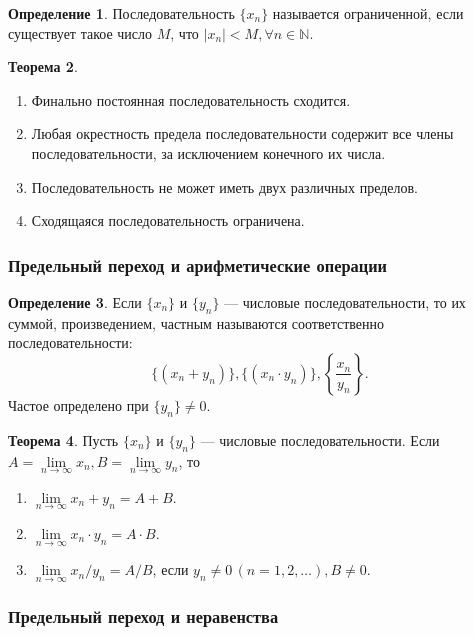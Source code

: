 \documentclass[12pt]{report}
\theoremstyle{definition}
\newtheorem{theorem}{Теорема}[chapter]
\newtheorem{definition}[theorem]{Определение}
\newcommand{\N}{\mathbb N}
\begin{document}
\begin{definition}
Последовательность $\{x_n\}$ называется ограниченной, если существует
такое число $M$, что $|x_n| < M, \forall n \in \N$.
\end{definition}

\begin{theorem}
  \begin{enumerate}
  \item Финально постоянная последовательность сходится.
    \item Любая окрестность предела последовательности содержит все члены последовательности,
    за исключением конечного их числа.
    \item Последовательность не может иметь двух различных пределов.
    \item Сходящаяся последовательность ограничена.
  \end{enumerate}
\end{theorem}

\subsubsection{Предельный переход и арифметические операции}

\begin{definition}
Если $\{x_n\}$ и $\{y_n\}$ --- числовые последовательности, то их суммой,
произведением, частным называются соответственно последовательности:
$$
\{(x_n + y_n)\}, \{(x_n \cdot y_n)\}, \left\{\dfrac{x_n}{y_n}\right\}.
$$
Частое определено при $\{y_n\} \ne 0$.
\end{definition}

\begin{theorem}
Пусть $\{x_n\}$ и $\{y_n\}$ --- числовые последовательности.
Если $A = \lim\limits_{n\rightarrow\infty} x_n, B = \lim\limits_{n\rightarrow\infty} y_n$, то
\begin{enumerate}
  \item $\lim\limits_{n\rightarrow\infty} x_n + y_n = A + B$.
  \item $\lim\limits_{n\rightarrow\infty} x_n \cdot y_n = A \cdot B$.
  \item $\lim\limits_{n\rightarrow\infty} x_n / y_n = A / B$, если $y_n \ne 0\, (n = 1, 2, \dots), B \ne 0$.
\end{enumerate}
\end{theorem}

\subsubsection{Предельный переход и неравенства}
\end{document}
